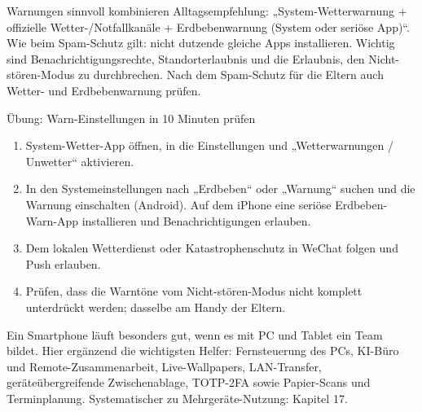 \begin{tcbinfo}{Warnungen sinnvoll kombinieren}
Alltagsempfehlung: „System-Wetterwarnung + offizielle Wetter-/Notfallkanäle + Erdbebenwarnung (System oder seriöse App)“. Wie beim Spam-Schutz gilt: nicht dutzende gleiche Apps installieren. Wichtig sind Benachrichtigungsrechte, Standorterlaubnis und die Erlaubnis, den Nicht-stören-Modus zu durchbrechen. Nach dem Spam-Schutz für die Eltern auch Wetter- und Erdbebenwarnung prüfen.

\end{tcbinfo}

\begin{tcbpractice}{Übung: Warn-Einstellungen in 10 Minuten prüfen}
\begin{enumerate}
  \item System-Wetter-App öffnen, in die Einstellungen und „Wetterwarnungen / Unwetter“ aktivieren.
  \item In den Systemeinstellungen nach „Erdbeben“ oder „Warnung“ suchen und die Warnung einschalten (Android). Auf dem iPhone eine seriöse Erdbeben-Warn-App installieren und Benachrichtigungen erlauben.
  \item Dem lokalen Wetterdienst oder Katastrophenschutz in WeChat folgen und Push erlauben.
  \item Prüfen, dass die Warntöne vom Nicht-stören-Modus nicht komplett unterdrückt werden; dasselbe am Handy der Eltern.
\end{enumerate}

\end{tcbpractice}


Ein Smartphone läuft besonders gut, wenn es mit PC und Tablet ein Team bildet. Hier ergänzend die wichtigsten Helfer: Fernsteuerung des PCs, KI-Büro und Remote-Zusammenarbeit, Live-Wallpapers, LAN-Transfer, geräteübergreifende Zwischenablage, TOTP-2FA sowie Papier-Scans und Terminplanung. Systematischer zu Mehrgeräte-Nutzung: Kapitel 17.


